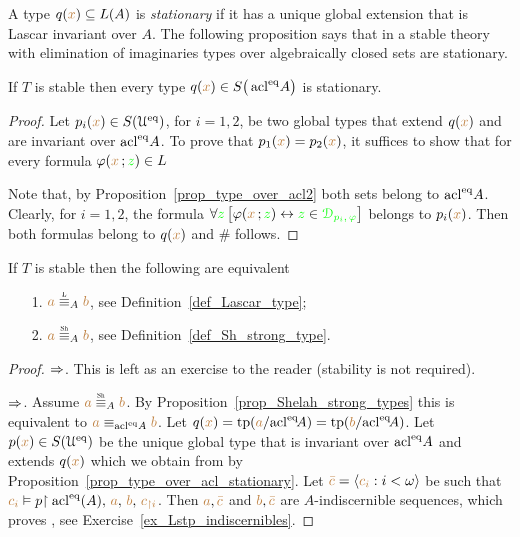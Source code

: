 \documentclass[creche.tex]{subfiles}
\begin{document}
A type $q({\color{brown} x})\subseteq L(A)$ is \emph{stationary\/} if it has a unique global extension that is Lascar invariant over $A$. The following proposition says that in a stable theory with elimination of imaginaries types over algebraically closed sets are stationary.

\begin{proposition}\label{prop_type_over_acl_stationary} If $T$ is stable then every type $q({\color{brown} x})\in S\big(\mathop{\rm acl}^{{\rm eq}}\!A\big)$ is stationary.
\end{proposition}

\begin{proof}
Let $p_i({\color{brown} x})\in S(\EuScript U^{{\rm eq}})$, for $i=1,2$, be two global types that extend $q({\color{brown} x})$ and are invariant over $\mathop{\rm acl}^{{\rm eq}}\!A$. To prove that $p_1({\color{brown} x}) =p_2({\color{brown} x})$, it suffices to show that for every formula $\varphi({\color{brown} x}\,;{\color{green} z})\in L$


Note that, by Proposition~\ref{prop_type_over_acl2} both sets belong to  $\mathop{\rm acl}^{{\rm eq}}\!A$. Clearly, for $i=1,2$, the formula $\forall{\color{green}z}\,\big[\varphi({\color{brown} x}\,;{\color{green} z})\leftrightarrow {\color{green}z}\in {\color{green}\EuScript D_{p_i,\,\varphi}}\big]$ belongs to $p_i({\color{brown} x})$. Then both formulas belong to $q({\color{brown} x})$ and $\#$ follows.
\end{proof}

\begin{corollary}
If $T$ is stable then the following are equivalent
\begin{itemize}
\item[1.] ${\mr a}\equivL_A{\mr b}$, see Definition~\ref{def_Lascar_type};
\item[2.] ${\mr a}\equivSh_A{\mr b}$, see Definition~\ref{def_Sh_strong_type}.
\end{itemize}
\end{corollary}
\begin{proof}$\Rightarrow$. This is left as an exercise to the reader (stability is not required).

$\Rightarrow$. Assume ${\mr a}\equivSh_A{\mr b}$. By Proposition~\ref{prop_Shelah_strong_types} this is equivalent to ${\color{brown} a}\equiv_{\mathop{\rm acl}^{{\rm eq}}\!A}{\color{brown} b}$. Let $q({\color{brown} x})={\rm tp}({\color{brown} a}/{\mathop{\rm acl}}^{{\rm eq}}\!A)={\rm tp}({\color{brown} b}/{\mathop{\rm acl}}^{{\rm eq}}\!A)$. Let $p({\color{brown} x})\in S(\EuScript U^{{\rm eq}})$ be the unique global type that is invariant over $\mathop{\rm acl}^{{\rm eq}}\! A$ and extends $q({\color{brown} x})$ which we obtain from by Proposition~\ref{prop_type_over_acl_stationary}. Let ${\color{brown}\bar c}=\langle{\color{brown}c_i}:i<\omega\rangle$ be such that ${\color{brown} c_i}\vDash p{\restriction \mathop{\rm acl}^{{\rm eq}}(A),\,{\color{brown} a},\,{\color{brown} b},\,{\color{brown} c_{\restriction i}}}$. Then ${\color{brown} a},{\color{brown}\bar c}$ and ${\color{brown} b},{\color{brown}\bar c}$ are $A$-indiscernible sequences, which proves , see Exercise~\ref{ex_Lstp_indiscernibles}.
\end{proof}
\end{document}
